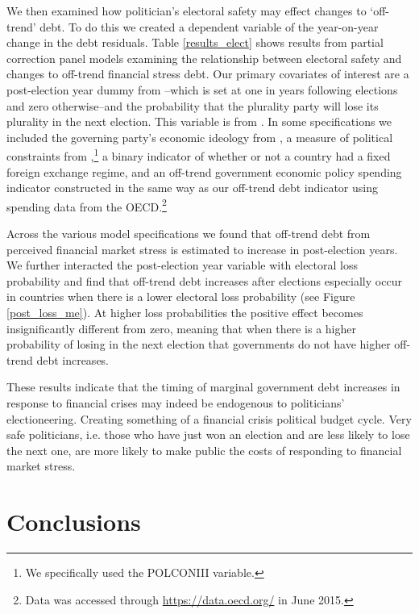 \documentclass[]{article}
\begin{document}
We then examined how politician's electoral safety may effect changes to `off-trend' debt. To do this we created a dependent variable of the year-on-year change in the debt residuals. Table \ref{results_elect} shows results from partial correction panel models examining the relationship between electoral safety and changes to off-trend financial stress debt. Our primary covariates of interest are a post-election year dummy from \cite{gandrudYrcurnt}--which is set at one in years following elections and zero otherwise--and the probability that the plurality party will lose its plurality in the next election. This variable is from \cite{Kayser2015comp}. In some specifications we included the governing party's economic ideology from \citep[][updated through 2012]{DPI2001}, a measure of political constraints from \cite[][updated through 2011]{Henisz2004},\footnote{We specifically used the POLCONIII variable.} a binary indicator of whether or not a country had a fixed foreign exchange regime, and an off-trend government economic policy spending indicator constructed in the same way as our off-trend debt indicator using spending data from the OECD.\footnote{Data was accessed through \url{https://data.oecd.org/} in June 2015.}

Across the various model specifications we found that off-trend debt from perceived financial market stress is estimated to increase in post-election years. We further interacted the post-election year variable with electoral loss probability and find that off-trend debt increases after elections especially occur in countries  when there is a lower electoral loss probability (see Figure \ref{post_loss_me}). At higher loss probabilities the positive effect becomes insignificantly different from zero, meaning that when there is a higher probability of losing in the next election that governments do not have higher off-trend debt increases.

These results indicate that the timing of marginal government debt increases in response to financial crises may indeed be endogenous to politicians' electioneering. Creating something of a financial crisis political budget cycle. Very safe politicians, i.e. those who have just won an election and are less likely to lose the next one, are more likely to make public the costs of responding to financial market stress.


\section{Conclusions}\label{conclusions}
\end{document}
